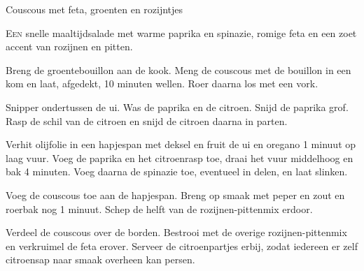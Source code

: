\begin{recipe}{Couscous met feta, groenten en rozijntjes}


\lettrine{E}{en} snelle maaltijdsalade met warme paprika en spinazie, romige
feta en een zoet accent van rozijnen en pitten.

\begin{ingredients}
\end{ingredients}

\begin{steps}
  \item Breng de groentebouillon aan de kook. Meng de couscous met de
        bouillon in een kom en laat, afgedekt, 10 minuten wellen. Roer daarna
        los met een vork.
  \item Snipper ondertussen de ui. Was de paprika en de citroen. Snijd de
        paprika grof. Rasp de schil van de citroen en snijd de citroen daarna
        in parten.
  \item Verhit olijfolie in een hapjespan met deksel en fruit de
        ui en oregano 1 minuut op laag vuur. Voeg de paprika en het
        citroenrasp toe, draai het vuur middelhoog en bak 4 minuten. Voeg
        daarna de spinazie toe, eventueel in delen, en laat slinken.
  \item Voeg de couscous toe aan de hapjespan. Breng op smaak met peper en
        zout en roerbak nog 1 minuut. Schep de helft van de
        rozijnen-pittenmix erdoor.
  \item Verdeel de couscous over de borden. Bestrooi met de overige
        rozijnen-pittenmix en verkruimel de feta erover. Serveer de
        citroenpartjes erbij, zodat iedereen er zelf citroensap naar smaak
        overheen kan persen.
\end{steps}
\end{recipe}
